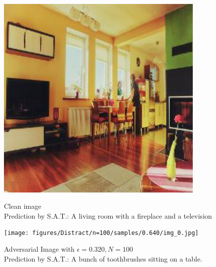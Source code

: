 \begin{figure}[ht]
    \centering
    \begin{minipage}{0.45\textwidth}
        \centering
        \includegraphics[width=0.9\textwidth]{figures/Distract/n=100/samples/0.000/img_0.jpg} %
        \caption*{Clean image\\Prediction by S.A.T.: A living room with a fireplace and a television}
    \end{minipage}\hfill
    \begin{minipage}{0.45\textwidth}
        \centering
        \texttt{[image: figures/Distract/n=100/samples/0.640/img\_0.jpg]} %
        \caption*{Adversarial Image with $\epsilon=0.320, N=100$\\Prediction by S.A.T.: A bunch of toothbrushes sitting on a table.}
    \end{minipage}
\end{figure}